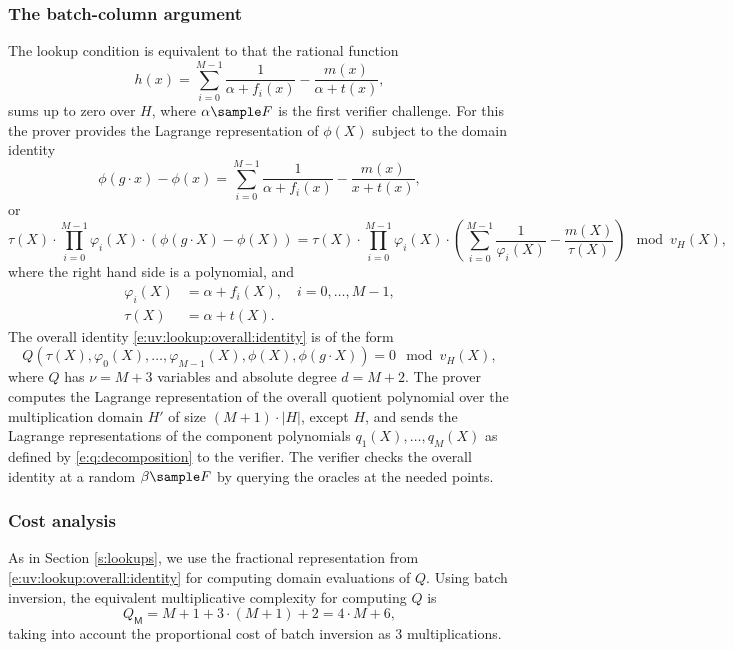 \documentclass[11pt]{article}
\theoremstyle{definition}
\theoremstyle{definition}
\begin{document}
\subsubsection{The batch-column argument}
The lookup condition is equivalent to that the rational function
\begin{equation}
\label{e:lookup:h}
h(x) = \sum_{i=0}^{M-1} \frac{1}{\alpha + f_i(x)} - \frac{m(x)}{\alpha + t(x)},
\end{equation}
sums up to zero over $H$, where $\alpha\sample F$ is the first verifier challenge.
For this the prover provides the Lagrange representation of $\phi(X)$ subject to the domain identity
\[
\phi(g\cdot x) - \phi(x) = \sum_{i=0}^{M-1} \frac{1}{\alpha + f_i(x)} - \frac{m(x)}{x + t(x)},
\]
or 
\begin{equation}
\label{e:uv:lookup:overall:identity}
 \tau(X) \cdot
\prod_{i=0}^{M-1} \varphi_i(X) \cdot (\phi(g\cdot X) - \phi(X))= 
 \tau(X) \cdot \prod_{i=0}^{M-1} \varphi_i(X)\cdot \left(\sum_{i=0}^{M-1} \frac{1}{\varphi_i(X)} - \frac{m(X)}{\tau(X)}\right) \mod v_H(X),
\end{equation}
where the right hand side is a polynomial, and 
\begin{align*}
\varphi_i(X) &= \alpha + f_i(X), \quad i=0,\ldots, M-1,
\\
 \tau(X) &= \alpha + t(X).
\end{align*}
The overall identity \eqref{e:uv:lookup:overall:identity} is of the form
\[
Q(\tau(X), \varphi_0(X), \ldots, \varphi_{M-1}(X), \phi(X), \phi(g\cdot X)) = 0 \mod v_H(X),
\]
where $Q$ has $\nu = M + 3$ variables and absolute degree $d= M + 2$. 
The prover computes the Lagrange representation of the overall quotient polynomial over the multiplication domain $H'$ of size $(M + 1)\cdot |H|$, except $H$,
and sends the Lagrange representations of the component polynomials $q_1(X),\ldots, q_{M}(X)$ as defined by \eqref{e:q:decomposition} to the verifier.
The verifier checks the overall identity at a random $\beta\sample F$ by querying the oracles at the needed points.

\subsubsection{Cost analysis}

As in Section \ref{s:lookups}, we use the fractional representation from \eqref{e:uv:lookup:overall:identity} for computing domain evaluations of $Q$. 
Using batch inversion, the equivalent multiplicative complexity for computing $Q$ is 
\[
Q_\mathsf M = M + 1 + 3\cdot (M+1) + 2 = 4\cdot M + 6,
\] 
taking into account the proportional cost of batch inversion as $3$ multiplications.  
\end{document}
